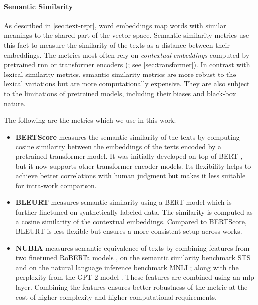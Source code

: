 {\paragraph{Semantic Similarity} As described in \autoref{sec:text-repr}, word embeddings map words with similar meanings to the shared part of the vector space. Semantic similarity metrics use this fact to measure the similarity of the texts as a distance between their embeddings. The metrics most often rely on \emph{contextual embeddings} computed by pretrained \ac{rnn} or transformer encoders (\citealp{peters2018deep,devlinBERTPretrainingDeep2019}; see \autoref{sec:transformer}). In contrast with lexical similarity metrics, semantic similarity metrics are more robust to the lexical variations but are more computationally expensive. They are also subject to the limitations of pretrained models, including their biases and black-box nature.

The following are the metrics which we use in this work:

\begin{itemize}
    \item \textbf{BERTScore} \cite{zhang2019bertscore} measures the semantic similarity of the texts by computing cosine similarity between the embeddings of the texts encoded by a pretrained transformer model. It was initially developed on top of BERT \cite{devlinBERTPretrainingDeep2019}, but it now supports other transformer encoder models. Its flexibility helps to achieve better correlations with human judgment but makes it less suitable for intra-work comparison.
    \item \textbf{BLEURT} \cite{sellam2020bleurt} measures semantic similarity using a BERT model \cite{devlinBERTPretrainingDeep2019} which is further finetuned on synthetically labeled data. The similarity is computed as a cosine similarity of the contextual embeddings. Compared to BERTScore, BLEURT is less flexible but ensures a more consistent setup across works.
    \item \textbf{NUBIA} \cite{kaneNUBIANeUralBased2020} measures semantic equivalence of texts by combining features from two finetuned RoBERTa models \cite{liuRoBERTaRobustlyOptimized2019}, on the semantic similarity benchmark STS \cite{cer-etal-2017-semeval} and on the natural language inference benchmark MNLI \cite{williams2018mnli}; along with the perplexity from the GPT-2 model \cite{radford2019language}. These features are combined using an \ac{mlp} layer. Combining the features ensures better robustness of the metric at the cost of higher complexity and higher computational requirements.
\end{itemize}

}
